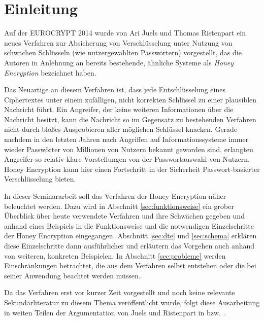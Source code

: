 \section{Einleitung}

Auf der EUROCRYPT 2014 wurde von Ari Juels und Thomas Ristenpart ein neues Verfahren zur Absicherung von Verschlüsselung unter Nutzung von schwachen Schlüsseln (wie nutzergewählten Passwörtern) vorgestellt, das die Autoren in Anlehnung an bereits bestehende, ähnliche Systeme als \emph{Honey Encryption} bezeichnet haben. 

Das Neuartige an diesem Verfahren ist, dass jede Entschlüsselung eines Ciphertextes unter einem zufälligen, nicht korrekten Schlüssel zu einer plausiblen Nachricht führt. Ein Angreifer, der keine weiteren Informationen über die Nachricht besitzt, kann die Nachricht so im Gegensatz zu bestehenden Verfahren nicht durch bloßes Ausprobieren aller möglichen Schlüssel knacken. Gerade nachdem in den letzten Jahren nach Angriffen auf Informationssysteme immer wieder Passwörter von Millionen von Nutzern bekannt geworden sind, erlangten  Angreifer so relativ klare Vorstellungen von der Passwortauswahl von Nutzern. Honey Encryption kann hier einen Fortschritt in der Sicherheit Passwort-basierter Verschlüsselung bieten.

In dieser Seminararbeit soll das Verfahren der Honey Encryption näher beleuchtet werden. Dazu wird in Abschnitt \ref{sec:funktionsweise} ein grober Überblick über heute verwendete Verfahren und ihre Schwächen gegeben und anhand eines Beispiels in die Funktionsweise und die notwendigen Einzelschritte der Honey Encryption eingegangen. Abschnitt \ref{sec:dte} und \ref{sec:schema} erklären diese Einzelschritte dann ausführlicher und erläutern das Vorgehen auch anhand von weiteren, konkreten Beispielen. In Abschnitt \ref{sec:probleme} werden Einschränkungen betrachtet, die aus dem Verfahren selbst entstehen oder die bei seiner Anwendung beachtet werden müssen.

Da das Verfahren erst vor kurzer Zeit vorgestellt und noch keine relevante Sekundärliteratur zu diesem Thema veröffentlicht wurde, folgt diese Ausarbeitung in weiten Teilen der Argumentation von Juels und Ristenpart in \cite{IEEE2014} bzw. \cite{EURO2014}.
